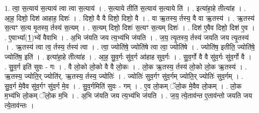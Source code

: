 \documentclass[17pt]{extarticle}
\begin{document}
1. त्वा॒ स॒त्याय॑ स॒त्याय॑ त्वा त्वा स॒त्याय॑ । . स॒त्याये तीति॑ स॒त्याय॑ स॒त्याये ति॑ । . इत्या॑हा॒हे तीत्या॑ह । . आ॒ह॒ दिशो॒ दिश॑ आहाह॒ दिशः॑ । . दिशो॒ वै वै दिशो॒ दिशो॒ वै । . वा ऋ॒तस्य॒ र्तस्य॒ वै वा ऋ॒तस्य॑ । . ऋ॒तस्य॑ स॒त्यꣳ स॒त्य मृ॒तस्य॒ र्तस्य॑ स॒त्यम् । . स॒त्यम् दिशो॒ दिशः॑ स॒त्यꣳ स॒त्यम् दिशः॑ । . दिश॑ ए॒वैव दिशो॒ दिश॑ ए॒व । . ए॒वाभ्या᳚(1॒)भ्ये॑ वैवाभि । . अ॒भि ज॑यति जय त्य॒भ्य॑भि ज॑यति । . ज॒य॒ त्यृ॒तस्य॒ र्तस्य॑ जयति जय त्यृ॒तस्य॑ । . ऋ॒तस्य॑ त्वा त्व॒ र्तस्य॒ र्तस्य॑ त्वा । . त्वा॒ ज्योति॑षे॒ ज्योति॑षे त्वा त्वा॒ ज्योति॑षे । . ज्योति॑ष॒ इतीति॒ ज्योति॑षे॒ ज्योति॑ष॒ इति॑ । . इत्या॑हा॒हे तीत्या॑ह । . आ॒ह॒ सु॒व॒र्गः सु॑व॒र्ग आ॑हाह सुव॒र्गः । . सु॒व॒र्गो वै वै सु॑व॒र्गः सु॑व॒र्गो वै । . सु॒व॒र्ग इति॑ सुवः - गः । . वै लो॒को लो॒को वै वै लो॒कः । . लो॒क ऋ॒तस्य॒ र्तस्य॑ लो॒को लो॒क ऋ॒तस्य॑ । . ऋ॒तस्य॒ ज्योति॒र् ज्योति॑र्. ऋ॒तस्य॒ र्तस्य॒ ज्योतिः॑ । . ज्योतिः॑ सुव॒र्गꣳ सु॑व॒र्गम् ज्योति॒र् ज्योतिः॑ सुव॒र्गम् । . सु॒व॒र्ग मे॒वैव सु॑व॒र्गꣳ सु॑व॒र्ग मे॒व । . सु॒व॒र्गमिति॑ सुवः - गम् । . ए॒व लो॒कम् ॅलो॒क मे॒वैव लो॒कम् । . लो॒क म॒भ्य॑भि लो॒कम् ॅलो॒क म॒भि । . अ॒भि ज॑यति जय त्य॒भ्य॑भि ज॑यति । . ज॒य॒ त्ये॒ताव॑न्त ए॒ताव॑न्तो जयति जय त्ये॒ताव॑न्तः । \newline
\end{document}
